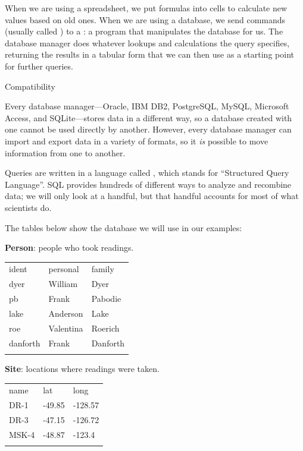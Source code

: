 \documentclass{book}
\begin{document}
When we are using a spreadsheet, we put formulas into cells to calculate
new values based on old ones. When we are using a database, we send
commands (usually called ) to a
: a program that
manipulates the database for us. The database manager does whatever
lookups and calculations the query specifies, returning the results in a
tabular form that we can then use as a starting point for further
queries.

\begin{swcbox}{Compatibility}

Every database manager---Oracle, IBM DB2, PostgreSQL, MySQL, Microsoft
Access, and SQLite---stores data in a different way, so a database
created with one cannot be used directly by another. However, every
database manager can import and export data in a variety of formats, so
it \emph{is} possible to move information from one to another.

\end{swcbox}

Queries are written in a language called , which
stands for ``Structured Query Language''. SQL provides hundreds of
different ways to analyze and recombine data; we will only look at a
handful, but that handful accounts for most of what scientists do.

The tables below show the database we will use in our examples:

\textbf{Person}: people who took readings.

\begin{tabular}{lll}
\hline\noalign{\medskip}
ident & personal & family
\\\noalign{\medskip}
\hline\noalign{\medskip}
dyer & William & Dyer
\\\noalign{\medskip}
pb & Frank & Pabodie
\\\noalign{\medskip}
lake & Anderson & Lake
\\\noalign{\medskip}
roe & Valentina & Roerich
\\\noalign{\medskip}
danforth & Frank & Danforth
\\\noalign{\medskip}
\hline
\end{tabular}

\textbf{Site}: locations where readings were taken.

\begin{tabular}{lll}
\hline\noalign{\medskip}
name & lat & long
\\\noalign{\medskip}
\hline\noalign{\medskip}
DR-1 & -49.85 & -128.57
\\\noalign{\medskip}
DR-3 & -47.15 & -126.72
\\\noalign{\medskip}
MSK-4 & -48.87 & -123.4
\\\noalign{\medskip}
\hline
\end{tabular}
\end{document}
